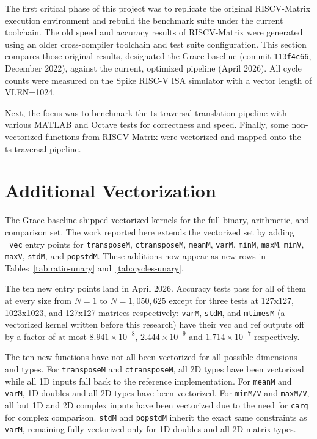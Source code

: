 

The first critical phase of this project was to replicate the original RISCV-Matrix execution environment and rebuild the benchmark suite under the current toolchain. The old speed and accuracy results of RISCV-Matrix were generated using an older cross-compiler toolchain and test suite configuration. This section compares those original results, designated the Grace baseline (commit \texttt{113f4c66}, December 2022), against the current, optimized pipeline (April 2026). All cycle counts were measured on the Spike RISC-V ISA simulator with a vector length of VLEN=1024.

Next, the focus was to benchmark the ts-traversal translation pipeline with various MATLAB and Octave tests for correctness and speed. Finally, some non-vectorized functions from RISCV-Matrix were vectorized and mapped onto the ts-traversal pipeline.

\section{Additional Vectorization}

The Grace baseline shipped vectorized kernels for the full binary, arithmetic, and comparison set. The work reported here extends the vectorized set by adding \texttt{\_vec} entry points for \texttt{transposeM}, \texttt{ctransposeM}, \texttt{meanM}, \texttt{varM}, \texttt{minM}, \texttt{maxM}, \texttt{minV}, \texttt{maxV}, \texttt{stdM}, and \texttt{popstdM}. These additions now appear as new rows in Tables~\ref{tab:ratio-unary} and~\ref{tab:cycles-unary}.

The ten new entry points land in April 2026. Accuracy tests pass for all of them at every size from $N=1$ to $N=1{,}050{,}625$ except for three tests at 127x127, 1023x1023, and 127x127 matrices respectively: \texttt{varM}, \texttt{stdM}, and \texttt{mtimesM} (a vectorized kernel written before this research) have their vec and ref outputs off by a factor of at most $8.941 \times 10^{-8}$, $2.444 \times 10^{-9}$ and $1.714 \times 10^{-7}$ respectively.

The ten new functions have not all been vectorized for all possible dimensions and types. For \texttt{transposeM} and \texttt{ctransposeM}, all 2D types have been vectorized while all 1D inputs fall back to the reference implementation. For \texttt{meanM} and \texttt{varM}, 1D doubles and all 2D types have been vectorized. 
For \texttt{minM/V} and \texttt{maxM/V}, all but 1D and 2D complex inputs have been vectorized due to the need for \texttt{carg} for complex comparison. \texttt{stdM} and \texttt{popstdM} inherit the exact same constraints as \texttt{varM}, remaining fully vectorized only for 1D doubles and all 2D matrix types.

